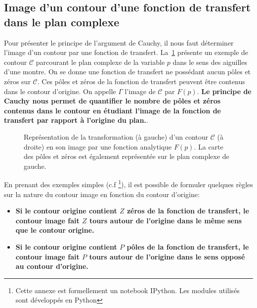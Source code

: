 \subsection[Image d'un contour d'une fonction de transfert dans $\mathcal{C}$]
{Image d'un contour d'une fonction de transfert dans le plan complexe}
Pour présenter le principe de l'argument de Cauchy, il nous faut déterminer
l'image d'un contour par une fonction de transfert. La~\cref{fig-contour_cauchy} 
présente un exemple de contour  $\mathcal{C}$ parcourant le plan complexe de
la variable $p$ dans le sens des aiguilles d'une montre. On se donne une fonction
de transfert ne possédant aucun pôles et zéros sur $\mathcal{C}$. Ces pôles
et zéros de la fonction de transfert peuvent être contenus dans le contour 
d'origine. On appelle $\Gamma$ l'image de 
$\mathcal{C}$ par $F(p)$. \textbf{Le principe de Cauchy nous permet de quantifier le 
nombre de pôles et zéros contenus dans le contour en étudiant l'image de la 
fonction de transfert par rapport à l'origine du plan.}.
\begin{figure}[!h]
    \centering
    
    \caption{Représentation de la transformation (à gauche) d'un contour $\mathcal{C}$ 
             (à droite) en son image par une fonction analytique $F(p)$. La carte 
             des pôles et zéros est également représentée sur le plan complexe de gauche.
    \label{fig-contour_cauchy}}
\end{figure}

En prenant des exemples simples (c.f \footnote{Cette 
annexe est formellement un notebook IPython. Les modules utilisés sont développés 
en Python}), il est possible 
de formuler quelques règles sur la nature du contour image en fonction 
du contour d'origine:
\begin{itemize}
    \item \textbf{Si le contour origine contient $Z$ zéros de la fonction de transfert,
          le contour image fait $Z$ tours autour de l'origine dans le même sens 
          que le contour origine.}
    \item \textbf{Si le contour origine contient $P$ pôles de la fonction de transfert,
          le contour image fait $P$ tours autour de l'origine dans le sens opposé au 
          contour d'origine.}
\end{itemize}

